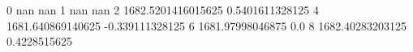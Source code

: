 0 nan nan
1 nan nan
2 1682.5201416015625 0.5401611328125
4 1681.640869140625 -0.339111328125
6 1681.97998046875 0.0
8 1682.40283203125 0.4228515625
